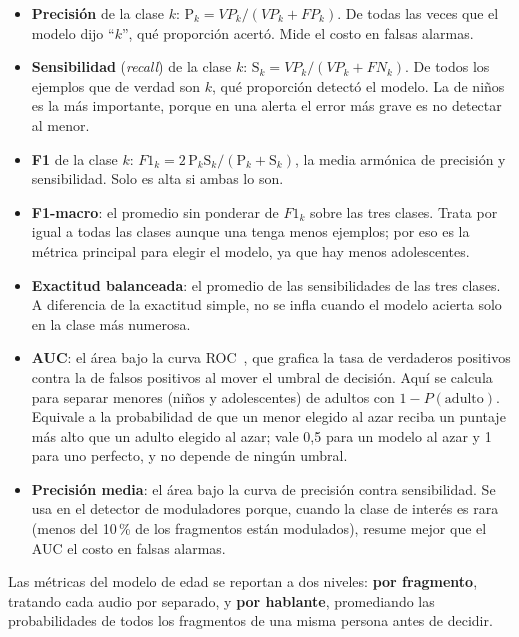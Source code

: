 \documentclass[11pt,a4paper]{article}
\begin{document}
\begin{itemize}
  \item \textbf{Precisión} de la clase $k$: $\mathrm{P}_k = VP_k / (VP_k + FP_k)$. De todas las veces que el modelo dijo ``$k$'', qué proporción acertó. Mide el costo en falsas alarmas.
  \item \textbf{Sensibilidad} (\emph{recall}) de la clase $k$: $\mathrm{S}_k = VP_k / (VP_k + FN_k)$. De todos los ejemplos que de verdad son $k$, qué proporción detectó el modelo. La de niños es la más importante, porque en una alerta el error más grave es no detectar al menor.
  \item \textbf{F1} de la clase $k$: $F1_k = 2\,\mathrm{P}_k \mathrm{S}_k / (\mathrm{P}_k + \mathrm{S}_k)$, la media armónica de precisión y sensibilidad. Solo es alta si ambas lo son.
  \item \textbf{F1-macro}: el promedio sin ponderar de $F1_k$ sobre las tres clases. Trata por igual a todas las clases aunque una tenga menos ejemplos; por eso es la métrica principal para elegir el modelo, ya que hay menos adolescentes.
  \item \textbf{Exactitud balanceada}: el promedio de las sensibilidades de las tres clases. A diferencia de la exactitud simple, no se infla cuando el modelo acierta solo en la clase más numerosa.
  \item \textbf{AUC}: el área bajo la curva ROC~\cite{fawcett2006}, que grafica la tasa de verdaderos positivos contra la de falsos positivos al mover el umbral de decisión. Aquí se calcula para separar menores (niños y adolescentes) de adultos con $1 - P(\text{adulto})$. Equivale a la probabilidad de que un menor elegido al azar reciba un puntaje más alto que un adulto elegido al azar; vale 0,5 para un modelo al azar y 1 para uno perfecto, y no depende de ningún umbral.
  \item \textbf{Precisión media}: el área bajo la curva de precisión contra sensibilidad. Se usa en el detector de moduladores porque, cuando la clase de interés es rara (menos del 10\,\% de los fragmentos están modulados), resume mejor que el AUC el costo en falsas alarmas.
\end{itemize}

Las métricas del modelo de edad se reportan a dos niveles: \textbf{por fragmento}, tratando cada audio por separado, y \textbf{por hablante}, promediando las probabilidades de todos los fragmentos de una misma persona antes de decidir.

\end{document}
